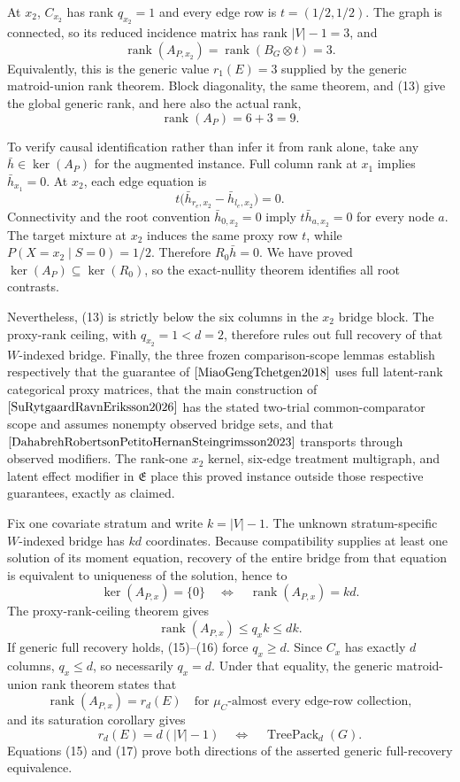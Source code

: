 At \(x_2\), \(C_{x_2}\) has rank \(q_{x_2}=1\) and every edge row is \(t=(1/2,1/2)\).  The graph is connected, so its reduced incidence matrix has rank \(|V|-1=3\), and
\[
\operatorname{rank}(A_{P,x_2})
=\operatorname{rank}(B_G\otimes t)
=3.
\tag{13}
\]
Equivalently, this is the generic value \(r_1(E)=3\) supplied by the generic matroid-union rank theorem.  Block diagonality, the same theorem, and (13) give the global generic rank, and here also the actual rank,
\[
\operatorname{rank}(A_P)=6+3=9.
\tag{14}
\]

To verify causal identification rather than infer it from rank alone, take any \(\bar h\in\ker(A_P)\) for the augmented instance.  Full column rank at \(x_1\) implies \(\bar h_{x_1}=0\).  At \(x_2\), each edge equation is
\[
t\bigl(\bar h_{r_e,x_2}-\bar h_{l_e,x_2}\bigr)=0.
\]
Connectivity and the root convention \(\bar h_{0,x_2}=0\) imply \(t\bar h_{a,x_2}=0\) for every node \(a\).  The target mixture at \(x_2\) induces the same proxy row \(t\), while \(P(X=x_2\mid S=0)=1/2\).  Therefore \(R_0\bar h=0\).  We have proved \(\ker(A_P)\subseteq\ker(R_0)\), so the exact-nullity theorem identifies all root contrasts.

Nevertheless, (13) is strictly below the six columns in the \(x_2\) bridge block.  The proxy-rank ceiling, with \(q_{x_2}=1<d=2\), therefore rules out full recovery of that \(W\)-indexed bridge.  Finally, the three frozen comparison-scope lemmas establish respectively that the guarantee of \(\cite{MiaoGengTchetgen2018}\) uses full latent-rank categorical proxy matrices, that the main construction of \(\cite{SuRytgaardRavnEriksson2026}\) has the stated two-trial common-comparator scope and assumes nonempty observed bridge sets, and that \(\cite{DahabrehRobertsonPetitoHernanSteingrimsson2023}\) transports through observed modifiers.  The rank-one \(x_2\) kernel, six-edge treatment multigraph, and latent effect modifier in \(\mathfrak E\) place this proved instance outside those respective guarantees, exactly as claimed.

Fix one covariate stratum and write \(k=|V|-1\).  The unknown stratum-specific \(W\)-indexed bridge has \(kd\) coordinates.  Because compatibility supplies at least one solution of its moment equation, recovery of the entire bridge from that equation is equivalent to uniqueness of the solution, hence to
\[
\ker(A_{P,x})=\{0\}
\quad\Longleftrightarrow\quad
\operatorname{rank}(A_{P,x})=kd.
\tag{15}
\]
The proxy-rank-ceiling theorem gives
\[
\operatorname{rank}(A_{P,x})\leq q_xk\leq dk.
\tag{16}
\]
If generic full recovery holds, (15)--(16) force \(q_x\geq d\).  Since \(C_x\) has exactly \(d\) columns, \(q_x\leq d\), so necessarily \(q_x=d\).  Under that equality, the generic matroid-union rank theorem states that
\[
\operatorname{rank}(A_{P,x})=r_d(E)
\quad\text{for \(\mu_C\)-almost every edge-row collection},
\]
and its saturation corollary gives
\[
r_d(E)=d(|V|-1)
\quad\Longleftrightarrow\quad
\operatorname{TreePack}_d(G).
\tag{17}
\]
Equations (15) and (17) prove both directions of the asserted generic full-recovery equivalence.


